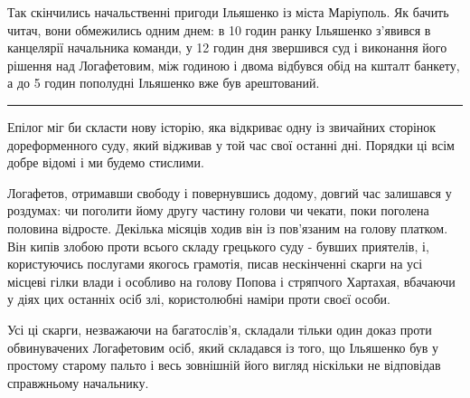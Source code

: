 \documentclass[a4paper,20pt]{report}
\begin{document}
Так скінчились начальственні пригоди Ільяшенко із міста Маріуполь. Як бачить
читач, вони обмежились одним днем: в 10 годин ранку Ільяшенко з'явився в
канцелярії начальника команди, у 12 годин дня звершився суд і виконання його
рішення над Логафетовим, між годиною і двома відбувся обід на кшталт банкету, а
до 5 годин пополудні Ільяшенко вже був арештований.

\par\noindent\rule{\textwidth}{0.4pt}

Епілог міг би скласти нову історію, яка відкриває одну із звичайних сторінок
дореформенного суду, який відживав у той час свої останні дні. Порядки ці всім
добре відомі і ми будемо стислими.

Логафетов, отримавши свободу і повернувшись додому, довгий час залишався у
роздумах: чи поголити йому другу частину голови чи чекати, поки поголена
половина відросте. Декілька місяців ходив він із пов'язаним на голову платком.
Він кипів злобою проти всього складу грецького суду - бувших приятелів, і,
користуючись послугами якогось грамотія, писав нескінченні скарги на усі
місцеві гілки влади і особливо на голову Попова і стряпчого Хартахая, вбачаючи
у діях цих останніх осіб злі, користолюбні наміри проти своєї особи.

Усі ці скарги, незважаючи на багатослів'я, складали тільки один доказ проти обвинувачених
Логафетовим осіб, який складався із того, що Ільяшенко був у простому
старому пальто і весь зовнішній його вигляд ніскільки не відповідав справжньому начальнику.
\end{document}
